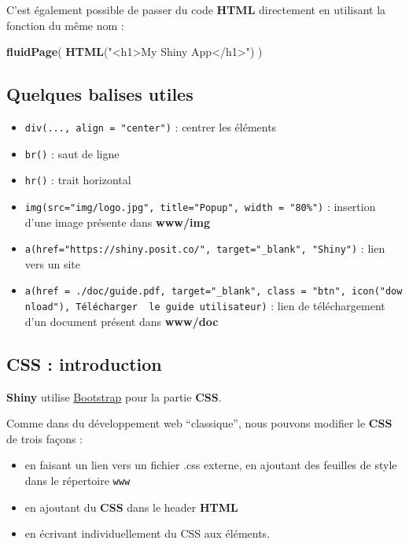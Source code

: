 \documentclass[
]{article}
\newenvironment{Shaded}{\begin{snugshade}}{\end{snugshade}}
\newcommand{\FunctionTok}[1]{\textcolor[rgb]{0.13,0.29,0.53}{\textbf{#1}}}
\newcommand{\NormalTok}[1]{#1}
\newcommand{\StringTok}[1]{\textcolor[rgb]{0.31,0.60,0.02}{#1}}
\providecommand{\tightlist}{%
  \setlength{\itemsep}{0pt}\setlength{\parskip}{0pt}}
\begin{document}
C'est également possible de passer du code \textbf{HTML} directement en
utilisant la fonction du même nom :

\begin{Shaded}
\begin{Highlighting}[]
\FunctionTok{fluidPage}\NormalTok{(}
  \FunctionTok{HTML}\NormalTok{(}\StringTok{"\textless{}h1\textgreater{}My Shiny App\textless{}/h1\textgreater{}"}\NormalTok{) }
\NormalTok{)}
\end{Highlighting}
\end{Shaded}

\hypertarget{quelques-balises-utiles}{%
\subsection{Quelques balises utiles}\label{quelques-balises-utiles}}

\begin{itemize}
\tightlist
\item
  \texttt{div(...,\ align\ =\ "center")} : centrer les éléments
\item
  \texttt{br()} : saut de ligne
\item
  \texttt{hr()} : trait horizontal
\item
  \texttt{img(src="img/logo.jpg",\ title="Popup",\ width\ =\ "80\%")} :
  insertion d'une image présente dans \textbf{www/img}
\item
  \texttt{a(href="https://shiny.posit.co/",\ target="\_blank",\ "Shiny")}
  : lien vers un site
\item
  \texttt{a(href\ =\ \textquotesingle{}./doc/guide.pdf\textquotesingle{},\ target="\_blank",\ class\ =\ "btn",\ icon("download"),\ \textquotesingle{}Télécharger\ \ le\ guide\ utilisateur\textquotesingle{})}
  : lien de téléchargement d'un document présent dans \textbf{www/doc}
\end{itemize}

\hypertarget{css-introduction}{%
\subsection{CSS : introduction}\label{css-introduction}}

\textbf{Shiny} utilise \href{http://getbootstrap.com/}{Bootstrap} pour
la partie \textbf{CSS}.

Comme dans du développement web ``classique'', nous pouvons modifier le
\textbf{CSS} de trois façons :

\begin{itemize}
\tightlist
\item
  en faisant un lien vers un fichier .css externe, en ajoutant des
  feuilles de style dans le répertoire \texttt{www}
\item
  en ajoutant du \textbf{CSS} dans le header \textbf{HTML}
\item
  en écrivant individuellement du CSS aux éléments.
\end{itemize}
\end{document}
